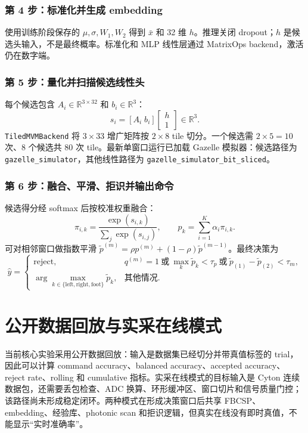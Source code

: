 \documentclass[
    TwoSide=false,
    Degree=graduate,
    GradLevel=master,
    Type=thesis,
    Title={光电混合运动想象脑机接口技术文档}
]{zjuthesis}
\begin{document}
\subsubsection{第 4 步：标准化并生成 embedding}
使用训练阶段保存的 $\mu,\sigma,W_1,W_2$ 得到 $\bar{x}$ 和 32 维 $h$。推理关闭 dropout；$h$ 是候选头输入，不是最终概率。标准化和 MLP 线性层通过 MatrixOps backend，激活仍在数字端。

\subsubsection{第 5 步：量化并扫描候选线性头}
每个候选包含 $A_i\in\mathbb{R}^{3\times32}$ 和 $b_i\in\mathbb{R}^{3}$：
\begin{equation}\label{eq:e2e-candidate}
s_i=[A_i\;b_i]\begin{bmatrix}h\\1\end{bmatrix}\in\mathbb{R}^{3}.
\end{equation}
\texttt{TiledMVM}\allowbreak\texttt{Backend} 将 $3\times33$ 增广矩阵按 $2\times8$ tile 切分。一个候选需 $2\times5=10$ 次、8 个候选共 80 次 tile。最新单窗口运行已加载 Gazelle 模拟器：候选路径为 \texttt{gazelle}\allowbreak\texttt{\_simulator}，其他线性路径为 \texttt{gazelle}\allowbreak\texttt{\_simulator}\allowbreak\texttt{\_bit}\allowbreak\texttt{\_sliced}。

\subsubsection{第 6 步：融合、平滑、拒识并输出命令}
候选得分经 softmax 后按校准权重融合：
\begin{equation}
\pi_{i,k}=\frac{\exp(s_{i,k})}{\sum_j\exp(s_{i,j})},\qquad
p_k=\sum_{i=1}^{K}\alpha_i\pi_{i,k}.
\end{equation}
可对相邻窗口做指数平滑 $\widetilde p^{(m)}=\rho p^{(m)}+(1-\rho)\widetilde p^{(m-1)}$。最终决策为
\begin{equation}\label{eq:final-decision}
\hat y=\begin{cases}
\mathrm{reject}, & q^{(m)}=1\ \text{或}\ \max_k\widetilde p_k<\tau_p\ \text{或}\ \widetilde p_{(1)}-\widetilde p_{(2)}<\tau_m,\\
\arg\max_{k\in\{\mathrm{left,right,foot}\}}\widetilde p_k, & \text{其他情况}.
\end{cases}
\end{equation}

\section{公开数据回放与实采在线模式}
当前核心实验采用公开数据回放：输入是数据集已经切分并带真值标签的 trial，因此可以计算 command accuracy、balanced accuracy、accepted accuracy、reject rate、rolling 和 cumulative 指标。实采在线模式的目标输入是 Cyton 连续数据包，还需要丢包检查、ADC 换算、环形缓冲区、窗口切片和信号质量门控；该路径尚未形成稳定闭环。两种模式在形成决策窗口后共享 FBCSP、embedding、经验库、photonic scan 和拒识逻辑，但真实在线没有即时真值，不能显示“实时准确率”。
\end{document}

